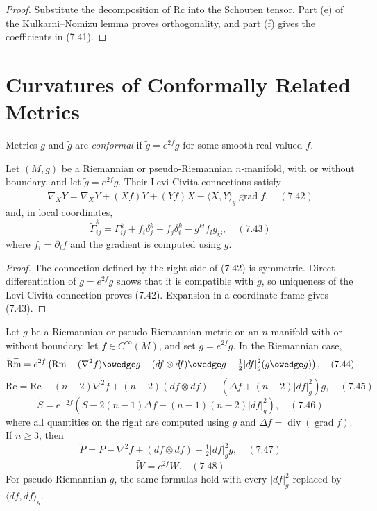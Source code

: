 \begin{proof}
\sketch
Substitute the decomposition of $\mathrm{Rc}$ into the Schouten tensor.
Part (e) of the Kulkarni--Nomizu lemma proves orthogonality, and part (f)
gives the coefficients in (7.41).
\end{proof}

\section{Curvatures of Conformally Related Metrics}

Metrics $g$ and $\widetilde g$ are \emph{conformal} if
$\widetilde g=e^{2f}g$ for some smooth real-valued $f$.

\begin{proposition}
\label{prop:conformal-transformation-levi-civita}
Let $(M,g)$ be a Riemannian or pseudo-Riemannian $n$-manifold, with or without
boundary, and let $\widetilde g=e^{2f}g$.  Their Levi-Civita connections satisfy
\[
\widetilde\nabla_XY=\nabla_XY+(Xf)Y+(Yf)X
-\langle X,Y\rangle_g\operatorname{grad}f, \quad (7.42)
\]
and, in local coordinates,
\[
\widetilde\Gamma^k_{ij}=\Gamma^k_{ij}+f_i\delta^k_j+f_j\delta^k_i
-g^{kl}f_lg_{ij}, \quad (7.43)
\]
where $f_i=\partial_if$ and the gradient is computed using $g$.
\end{proposition}

\begin{proof}
\sketch
The connection defined by the right side of (7.42) is symmetric.  Direct
differentiation of $\widetilde g=e^{2f}g$ shows that it is compatible with
$\widetilde g$, so uniqueness of the Levi-Civita connection proves (7.42).
Expansion in a coordinate frame gives (7.43).
\end{proof}

\begin{theorem}
\label{thm:conformal-transformation-curvature}
Let $g$ be a Riemannian or pseudo-Riemannian metric on an $n$-manifold with or
without boundary, let $f\in C^\infty(M)$, and set $\widetilde g=e^{2f}g$.
In the Riemannian case,
\[
\widetilde{\mathrm{Rm}}=e^{2f}\left(\mathrm{Rm}-(\nabla^2f)\owedge g
+(df\otimes df)\owedge g-\tfrac12|df|_g^2(g\owedge g)\right), \quad (7.44)
\]
\[
\widetilde{\mathrm{Rc}}=\mathrm{Rc}-(n-2)\nabla^2f
+(n-2)(df\otimes df)-(\Delta f+(n-2)|df|_g^2)g, \quad (7.45)
\]
\[
\widetilde S=e^{-2f}\left(S-2(n-1)\Delta f
-(n-1)(n-2)|df|_g^2\right), \quad (7.46)
\]
where all quantities on the right are computed using $g$ and
$\Delta f=\operatorname{div}(\operatorname{grad}f)$.  If $n\geq3$, then
\[
\widetilde P=P-\nabla^2f+(df\otimes df)-\tfrac12|df|_g^2g, \quad (7.47)
\]
\[
\widetilde W=e^{2f}W. \quad (7.48)
\]
For pseudo-Riemannian $g$, the same formulas hold with every $|df|_g^2$
replaced by $\langle df,df\rangle_g$.
\end{theorem}

